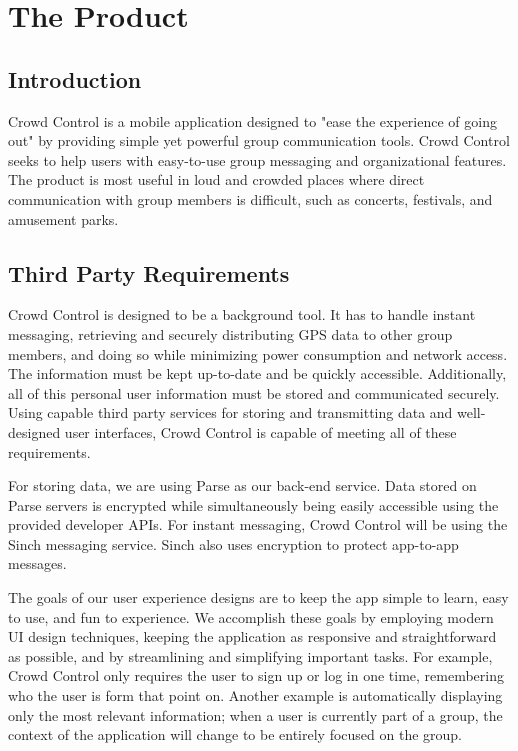


\renewcommand{\familydefault}{\sfdefault}
\renewcommand{\arraystretch}{1.5}

\chapter{The Product}

\section{Introduction}

Crowd Control is a mobile application designed to "ease the experience of going out" by providing
simple yet powerful group communication tools. Crowd Control seeks to help users with easy-to-use
group messaging and organizational features. The product is most useful in loud and crowded places
where direct communication with group members is difficult, such as concerts, festivals, and
amusement parks.



\section{Third Party Requirements}

Crowd Control is designed to be a background tool. It has to handle instant messaging, retrieving and
securely distributing GPS data to other group members, and doing so while minimizing power
consumption and network access. The information must be kept up-to-date and be quickly accessible.
Additionally, all of this personal user information must be stored and communicated securely. Using
capable third party services for storing and transmitting data and well-designed user interfaces, Crowd
Control is capable of meeting all of these requirements.

For storing data, we are using Parse as our back-end service. Data stored on Parse servers is
encrypted while simultaneously being easily accessible using the provided developer APIs. For instant
messaging, Crowd Control will be using the Sinch messaging service. Sinch also uses encryption to
protect app-to-app messages.

The goals of our user experience designs are to keep the app simple to learn, easy to use, and fun to
experience. We accomplish these goals by employing modern UI design techniques, keeping the
application as responsive and straightforward as possible, and by streamlining and simplifying
important tasks. For example, Crowd Control only requires the user to sign up or log in one time,
remembering who the user is form that point on. Another example is automatically displaying only the
most relevant information; when a user is currently part of a group, the context of the application will
change to be entirely focused on the group.\\

